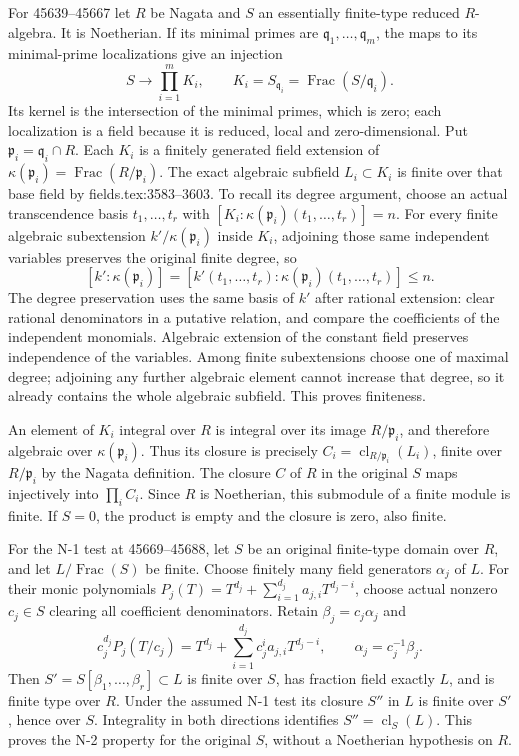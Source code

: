 For 45639--45667 let \(R\) be Nagata and \(S\) an essentially finite-type reduced \(R\)-algebra. It is Noetherian. If its minimal primes are \(\mathfrak q_1,\ldots,\mathfrak q_m\), the maps to its minimal-prime localizations give an injection \[
 S\longrightarrow\prod_{i=1}^m K_i,
 \qquad K_i=S_{\mathfrak q_i}=\operatorname{Frac}(S/\mathfrak q_i).
\] Its kernel is the intersection of the minimal primes, which is zero; each localization is a field because it is reduced, local and zero-dimensional. Put \(\mathfrak p_i=\mathfrak q_i\cap R\). Each \(K_i\) is a finitely generated field extension of \(\kappa(\mathfrak p_i)=\operatorname{Frac}(R/\mathfrak p_i)\). The exact algebraic subfield \(L_i\subset K_i\) is finite over that base field by fields.\AlgebraIdentifierBreak{}tex:\AlgebraIdentifierBreak{}3583--\AlgebraIdentifierBreak{}3603. To recall its degree argument, choose an actual transcendence basis \(t_1,\ldots,t_r\) with \([K_i:\kappa(\mathfrak p_i)(t_1,\ldots,t_r)]=n\). For every finite algebraic subextension \(k'/\kappa(\mathfrak p_i)\) inside \(K_i\), adjoining those same independent variables preserves the original finite degree, so \[
 [k':\kappa(\mathfrak p_i)]
 =[k'(t_1,\ldots,t_r):\kappa(\mathfrak p_i)(t_1,\ldots,t_r)]\leq n.
\] The degree preservation uses the same basis of \(k'\) after rational extension: clear rational denominators in a putative relation, and compare the coefficients of the independent monomials. Algebraic extension of the constant field preserves independence of the variables. Among finite subextensions choose one of maximal degree; adjoining any further algebraic element cannot increase that degree, so it already contains the whole algebraic subfield. This proves finiteness.

An element of \(K_i\) integral over \(R\) is integral over its image \(R/\mathfrak p_i\), and therefore algebraic over \(\kappa(\mathfrak p_i)\). Thus its closure is precisely \(C_i=\operatorname{cl}_{R/\mathfrak p_i}(L_i)\), finite over \(R/\mathfrak p_i\) by the Nagata definition. The closure \(C\) of \(R\) in the original \(S\) maps injectively into \(\prod_i C_i\). Since \(R\) is Noetherian, this submodule of a finite module is finite. If \(S=0\), the product is empty and the closure is zero, also finite.

For the N-1 test at 45669--45688, let \(S\) be an original finite-type domain over \(R\), and let \(L/\operatorname{Frac}(S)\) be finite. Choose finitely many field generators \(\alpha_j\) of \(L\). For their monic polynomials \(P_j(T)=T^{d_j}+\sum_{i=1}^{d_j}a_{j,i}T^{d_j-i}\), choose actual nonzero \(c_j\in S\) clearing all coefficient denominators. Retain \(\beta_j=c_j\alpha_j\) and \[
 c_j^{d_j}P_j(T/c_j)
 =T^{d_j}+\sum_{i=1}^{d_j}c_j^i a_{j,i}T^{d_j-i},
 \qquad \alpha_j=c_j^{-1}\beta_j.
\] Then \(S'=S[\beta_1,\ldots,\beta_r]\subset L\) is finite over \(S\), has fraction field exactly \(L\), and is finite type over \(R\). Under the assumed N-1 test its closure \(S''\) in \(L\) is finite over \(S'\), hence over \(S\). Integrality in both directions identifies \(S''=\operatorname{cl}_S(L)\). This proves the N-2 property for the original \(S\), without a Noetherian hypothesis on \(R\).

